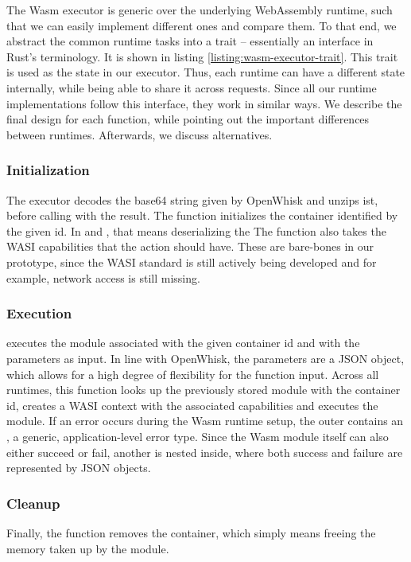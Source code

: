 The Wasm executor is generic over the underlying WebAssembly runtime, such that we can easily implement different ones and compare them. To that end, we abstract the common runtime tasks into a trait -- essentially an interface in Rust's terminology. It is shown in listing \ref{listing:wasm-executor-trait}. This trait is used as the state in our executor. Thus, each runtime can have a different state internally, while being able to share it across requests. Since all our runtime implementations follow this interface, they work in similar ways. We describe the final design for each function, while pointing out the important differences between runtimes. Afterwards, we discuss alternatives.

\subsubsection{Initialization}
The executor decodes the base64 string given by OpenWhisk and unzips ist, before calling  with the result. The function initializes the container identified by the given id. In  and , that means deserializing the 
The function also takes the WASI capabilities that the action should have. These are bare-bones in our prototype, since the WASI standard is still actively being developed and for example, network access is still missing.

\subsubsection{Execution}
 executes the module associated with the given container id and with the parameters as input. In line with OpenWhisk, the parameters are a JSON object, which allows for a high degree of flexibility for the function input. Across all runtimes, this function looks up the previously stored module with the container id, creates a WASI context with the associated capabilities and executes the module. If an error occurs during the Wasm runtime setup, the outer  contains an , a generic, application-level error type. Since the Wasm module itself can also either succeed or fail, another  is nested inside, where both success and failure are represented by JSON objects.

\subsubsection{Cleanup}
Finally, the  function removes the container, which simply means freeing the memory taken up by the module.

